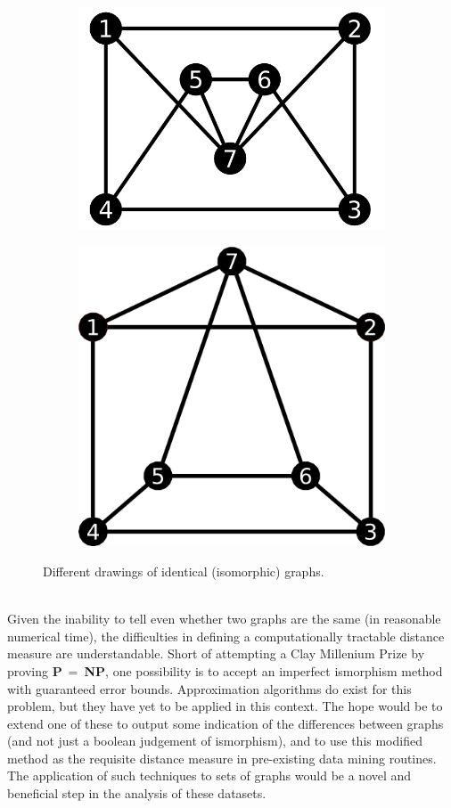 \documentclass[11pt]{article}
\begin{document}
\begin{figure}[h!]
  \centering
  \begin{subfigure}{.5\textwidth}
    \centering
    \includegraphics[width=.65\linewidth]{graphA}
    \caption{}
    \label{fig:graphA}
  \end{subfigure}%
  \begin{subfigure}{.5\textwidth}
    \centering
    \includegraphics[width=.65\linewidth]{graphB}
    \caption{}
    \label{fig:graphB}
  \end{subfigure}%
  \caption{Different drawings of identical (isomorphic) graphs.}
  \label{fig:isoGraphs}
\end{figure}
\vspace{1mm}\\
Given the inability to tell even whether two graphs are the same (in reasonable numerical time), the difficulties in defining a computationally tractable distance measure are understandable. Short of attempting a Clay Millenium Prize by proving \textbf{P}$ \ = \ $\textbf{NP}, one possibility is to accept an imperfect ismorphism method with guaranteed error bounds. Approximation algorithms do exist for this problem, but they have yet to be applied in this context. The hope would be to extend one of these to output some indication of the differences between graphs (and not just a boolean judgement of ismorphism), and to use this modified method as the requisite distance measure in pre-existing data mining routines. The application of such techniques to sets of graphs would be a novel and beneficial step in the analysis of these datasets.
\end{document}
